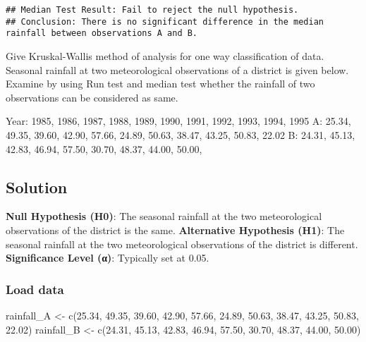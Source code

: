 \documentclass[
]{article}
\newenvironment{Shaded}{\begin{snugshade}}{\end{snugshade}}
\newcommand{\FloatTok}[1]{\textcolor[rgb]{0.00,0.00,0.81}{#1}}
\newcommand{\FunctionTok}[1]{\textcolor[rgb]{0.00,0.00,0.00}{#1}}
\newcommand{\NormalTok}[1]{#1}
\newcommand{\OtherTok}[1]{\textcolor[rgb]{0.56,0.35,0.01}{#1}}
\begin{document}
\begin{verbatim}
## Median Test Result: Fail to reject the null hypothesis.
## Conclusion: There is no significant difference in the median rainfall between observations A and B.
\end{verbatim}

Give Kruskal-Wallis method of analysis for one way classification of
data. Seasonal rainfall at two meteorological observations of a district
is given below. Examine by using Run test and median test whether the
rainfall of two observations can be considered as same.

Year: 1985, 1986, 1987, 1988, 1989, 1990, 1991, 1992, 1993, 1994, 1995
A: 25.34, 49.35, 39.60, 42.90, 57.66, 24.89, 50.63, 38.47, 43.25, 50.83,
22.02 B: 24.31, 45.13, 42.83, 46.94, 57.50, 30.70, 48.37, 44.00, 50.00,

\hypertarget{solution-8}{%
\subsection{Solution}\label{solution-8}}

\textbf{Null Hypothesis (H0)}: The seasonal rainfall at the two
meteorological observations of the district is the same.
\textbf{Alternative Hypothesis (H1)}: The seasonal rainfall at the two
meteorological observations of the district is different.
\textbf{Significance Level (α)}: Typically set at 0.05.

\hypertarget{load-data-8}{%
\subsubsection{Load data}\label{load-data-8}}

\begin{Shaded}
\begin{Highlighting}[]
\NormalTok{rainfall\_A }\OtherTok{\textless{}{-}} \FunctionTok{c}\NormalTok{(}\FloatTok{25.34}\NormalTok{, }\FloatTok{49.35}\NormalTok{, }\FloatTok{39.60}\NormalTok{, }\FloatTok{42.90}\NormalTok{, }\FloatTok{57.66}\NormalTok{, }\FloatTok{24.89}\NormalTok{, }\FloatTok{50.63}\NormalTok{, }\FloatTok{38.47}\NormalTok{, }\FloatTok{43.25}\NormalTok{, }\FloatTok{50.83}\NormalTok{, }\FloatTok{22.02}\NormalTok{)}
\NormalTok{rainfall\_B }\OtherTok{\textless{}{-}} \FunctionTok{c}\NormalTok{(}\FloatTok{24.31}\NormalTok{, }\FloatTok{45.13}\NormalTok{, }\FloatTok{42.83}\NormalTok{, }\FloatTok{46.94}\NormalTok{, }\FloatTok{57.50}\NormalTok{, }\FloatTok{30.70}\NormalTok{, }\FloatTok{48.37}\NormalTok{, }\FloatTok{44.00}\NormalTok{, }\FloatTok{50.00}\NormalTok{)}
\end{Highlighting}
\end{Shaded}
\end{document}
